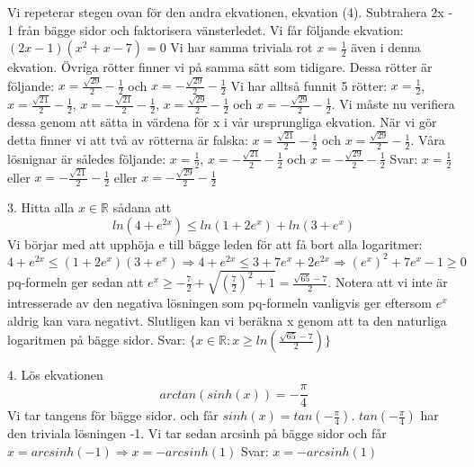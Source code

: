 \documentclass{article}
\begin{document}
  Vi repeterar stegen ovan för den andra ekvationen, ekvation (4). Subtrahera 2x - 1 från bägge sidor och faktorisera vänsterledet. Vi får följande ekvation:\newline \newline
  $(2x - 1)(x^2 + x - 7) = 0$ \newline \newline
  Vi har samma triviala rot $x = \frac{1}{2}$ även i denna ekvation. Övriga rötter finner vi på samma sätt som tidigare. Dessa rötter är följande: $x = \frac{\sqrt{29}}{2} - \frac{1}{2}$ och $x = -\frac{\sqrt{29}}{2} - \frac{1}{2}$ \newline \newline
  Vi har alltså funnit 5 rötter: $x = \frac{1}{2}$, $x = \frac{\sqrt{21}}{2} - \frac{1}{2}$, $x = -\frac{\sqrt{21}}{2} - \frac{1}{2}$, $x = \frac{\sqrt{29}}{2} - \frac{1}{2}$ och $x = -\frac{\sqrt{29}}{2} - \frac{1}{2}$. Vi måste nu verifiera dessa genom att sätta in värdena för x i vår ursprungliga ekvation. När vi gör detta finner vi att två av rötterna är falska: $x = \frac{\sqrt{21}}{2} - \frac{1}{2}$ och $x = \frac{\sqrt{29}}{2} - \frac{1}{2}$. Våra lösnignar är således följande: $x = \frac{1}{2}$, $x = -\frac{\sqrt{21}}{2} - \frac{1}{2}$ och $x = -\frac{\sqrt{29}}{2} - \frac{1}{2}$ \newline \newline
  Svar: $x = \frac{1}{2}$ eller $x = -\frac{\sqrt{21}}{2} - \frac{1}{2}$ eller $x = -\frac{\sqrt{29}}{2} - \frac{1}{2}$\newline \newline
  
  3. Hitta alla $x \in \mathbb{R}$ sådana att 
  \begin{equation}
      ln(4 + e^{2x}) \leq ln(1 + 2e^x) + ln(3 + e^x)
  \end{equation}
  Vi börjar med att upphöja e till bägge leden för att få bort alla logaritmer:\newline
  $4 + e^{2x} \leq (1 + 2e^x)(3 + e^x) \Rightarrow 4 + e^{2x} \leq 3 + 7e^x + 2e^{2x} \Rightarrow (e^x)^2 + 7e^x - 1 \geq 0$\newline pq-formeln ger sedan att $e^x \geq -\frac{7}{2} + \sqrt{(\frac{7}{2})^2 + 1} = \frac{\sqrt{65} - 7}{2}$. Notera att vi inte är intresserade av den negativa lösningen som pq-formeln vanligvis ger eftersom $e^x$ aldrig kan vara negativt. Slutligen kan vi beräkna x genom att ta den naturliga logaritmen på bägge sidor.\newline \newline
  Svar: $\{x \in \mathbb{R}: x \geq ln(\frac{\sqrt{65} - 7}{2})\}$\newline
  
  4. Lös ekvationen 
  \begin{equation}
      arctan(sinh(x)) = -\frac{\pi}{4}
  \end{equation}
  Vi tar tangens för bägge sidor. och får $sinh(x) = tan(-\frac{\pi}{4})$. $tan(-\frac{\pi}{4})$ har den triviala lösningen -1. Vi tar sedan arcsinh på bägge sidor och får $x = arcsinh(-1) \Rightarrow x = -arcsinh(1)$ \newline \newline
  Svar: $x = -arcsinh(1)$
  
\end{document}
